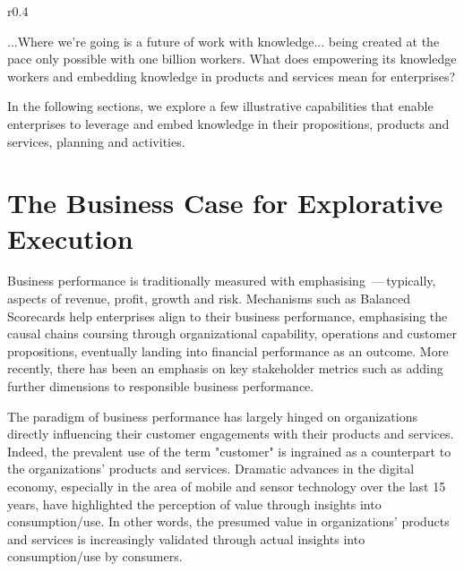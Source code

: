 \begin{wrapfigure}[9]{r}{0.4\textwidth}
    \vspace{-12pt}
    \begin{center}
        \begin{tcolorbox}[colback=secondary!5,colframe=secondary!60,title=2019\,---\,When
            we exceeded 1 billion Knowledge Workers]
            ...Where we’re going is a future of work with knowledge...
            being created at the pace only possible with one billion workers.
            What does empowering its knowledge workers and embedding knowledge in
            products and services mean for enterprises?
        \end{tcolorbox}
    \end{center}
\end{wrapfigure}

In the following sections, we explore a few illustrative capabilities that enable enterprises to leverage and embed
knowledge in their propositions, products and services, planning and activities.

\section*{The Business Case for Explorative Execution}

Business performance is traditionally measured with  emphasising
\,---\,typically, aspects of
revenue,
profit,
growth and
risk.
Mechanisms such as Balanced Scorecards help enterprises align 
to their business performance, emphasising the causal chains coursing through organizational capability, operations and
customer propositions, eventually landing into financial performance as an outcome.
More recently, there has been an emphasis on key stakeholder metrics such as  adding further
dimensions to responsible business performance.

The paradigm of business performance has largely hinged on organizations directly influencing their customer
engagements with their products and services.
Indeed, the prevalent use of the term "customer" is ingrained as a counterpart to the organizations’
products and services.
Dramatic advances in the digital economy, especially in the area of mobile and sensor technology over the last 15 years,
have highlighted the perception of value through insights into consumption/use.
In other words, the presumed value in organizations’ products and services is increasingly validated through
actual insights into consumption/use by consumers.

